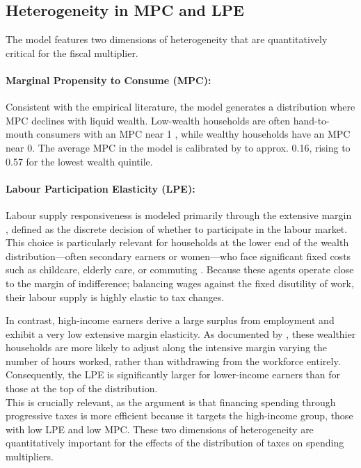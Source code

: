 \documentclass[12pt,letterpaper]{article}
\begin{document}
\subsection{Heterogeneity in MPC and LPE}
The model features two dimensions of heterogeneity that are quantitatively critical for the fiscal multiplier.

\paragraph{Marginal Propensity to Consume (MPC):}
Consistent with the empirical literature, the model generates a distribution where MPC declines with liquid wealth. Low-wealth households are often hand-to-mouth consumers with an MPC near 1 \cite{LSEbook}, while wealthy households have an MPC near 0. The average MPC in the model is calibrated by \cite{FN} to approx. 0.16, rising to 0.57 for the lowest wealth quintile.

\paragraph{Labour Participation Elasticity (LPE):}
Labour supply responsiveness is modeled primarily through the extensive margin \citep{Heckman1993}, defined as the discrete decision of whether to participate in the labour market. This choice is particularly relevant for households at the lower end of the wealth distribution—often secondary earners or women—who face significant fixed costs such as childcare, elderly care, or commuting \citep{LSEbook}. Because these agents operate close to the margin of indifference; balancing wages against the fixed disutility of work, their labour supply is highly elastic to tax changes.

In contrast, high-income earners derive a large surplus from employment and exhibit a very low extensive margin elasticity. As documented by \cite{Blundell1995}, these wealthier households are more likely to adjust along the intensive margin varying the number of hours worked, rather than withdrawing from the workforce entirely. Consequently, the LPE is significantly larger for lower-income earners than for those at the top of the distribution.
\\
This is crucially relevant, as the argument \cite{FN} is that financing spending through progressive taxes is more efficient because it targets the high-income group, those with low LPE and low MPC.
These two dimensions of heterogeneity are quantitatively important for the effects of the distribution of taxes on spending multipliers.
\end{document}
